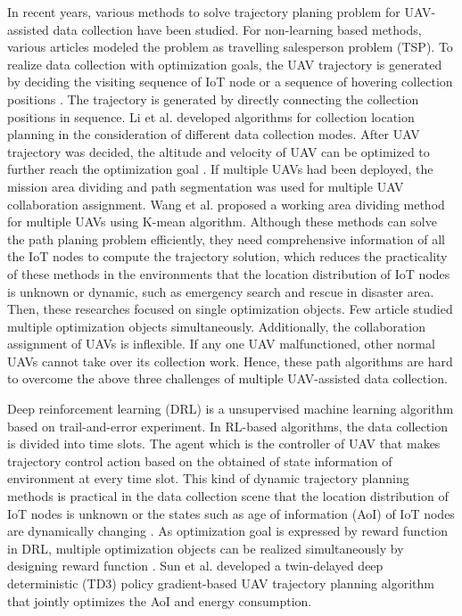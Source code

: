 \documentclass[journal]{IEEEtran}
\begin{document}
In recent years, various methods to solve trajectory planing problem for UAV-assisted data collection have been studied. For non-learning based methods, various articles modeled the problem as travelling salesperson problem (TSP). To realize data collection with optimization goals, the UAV trajectory is generated by deciding the visiting sequence of IoT node or a sequence of hovering collection positions \cite{Yan23,TWang22,YLi23,Shen22,MLi23,XHuang20}. The trajectory is generated by directly connecting the collection positions in sequence. Li et al. \cite{YLi23} developed algorithms for collection location planning in the consideration of different data collection modes. After UAV trajectory was decided, the altitude and velocity of UAV can be optimized to further reach the optimization goal \cite{JLi20}. If multiple UAVs had been deployed, the mission area dividing \cite{TWang22} and path segmentation \cite{XHuang20} was used for multiple UAV collaboration assignment. Wang et al. proposed a working area dividing method for multiple UAVs using K-mean algorithm. Although these methods can solve the path planing problem efficiently, they need comprehensive information of all the IoT nodes to compute the trajectory solution, which reduces the practicality of these methods in the environments that the location distribution of IoT nodes is unknown or dynamic, such as emergency search and rescue in disaster area. Then, these researches focused on single optimization objects. Few article studied multiple optimization objects simultaneously. Additionally, the collaboration assignment of UAVs is inflexible. If any one UAV malfunctioned, other normal UAVs cannot take over its collection work. Hence, these path algorithms are hard to overcome the above three challenges of multiple UAV-assisted data collection. 

Deep reinforcement learning (DRL) is a unsupervised machine learning algorithm based on trail-and-error experiment. In RL-based algorithms, the data collection is divided into time slots. The agent which is the controller of UAV that makes trajectory control action based on the obtained of state information of environment at every time slot. This kind of dynamic trajectory planning methods is practical in the data collection scene that the location distribution of IoT nodes is unknown \cite{Nguyen22,RLiu23} or the states such as age of information (AoI) of IoT nodes are dynamically changing \cite{LLiu22,MYi23,SLi22}. As optimization goal is expressed by reward function in DRL, multiple optimization objects can be realized simultaneously by designing reward function \cite{Nguyen22,Sun21}. Sun et al. \cite{Sun21} developed a twin-delayed deep deterministic (TD3) policy gradient-based UAV trajectory planning algorithm that jointly optimizes the AoI and energy consumption. 
\end{document}
